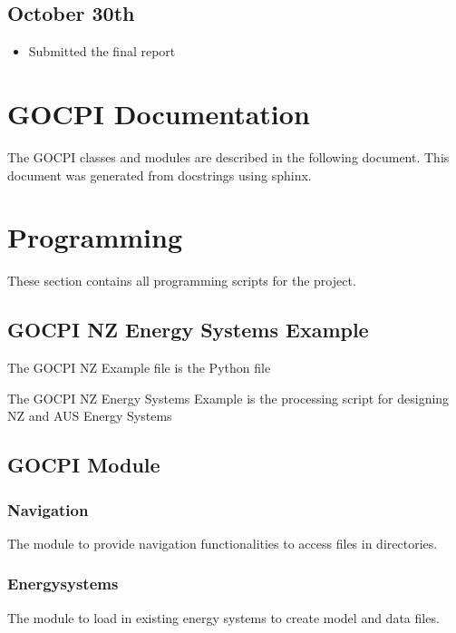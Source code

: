 \documentclass[12pt]{article}
\begin{document}
\subsection*{October 30th}
\begin{itemize}
	\item Submitted the final report
\end{itemize}
\newpage

\section{GOCPI Documentation}\label{Docstring}
The GOCPI classes and modules are described in the following document.
This document was generated from docstrings using sphinx.
\newpage

\newpage

\section{Programming}
These section contains all programming scripts for the project.
\subsection{GOCPI NZ Energy Systems Example}
The GOCPI NZ Example file is the Python file

The GOCPI NZ Energy Systems Example is the processing script for designing NZ and AUS Energy Systems
\subsection{GOCPI Module}
\subsubsection{Navigation}
The module to provide navigation functionalities to access files in directories.

\subsubsection{Energysystems}
The module to load in existing energy systems to create model and data files.

\end{document}
